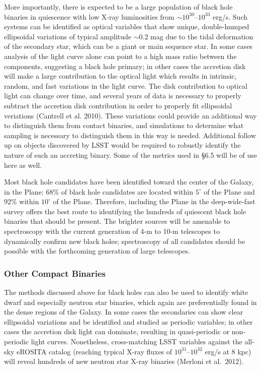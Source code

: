 More importantly, there is expected to be a large population of black hole binaries in quiescence with low X-ray luminosities from $\sim 10^{30}$--$10^{33}$ erg/s.
Such systems can be identified as optical variables that show unique, double-humped ellipsoidal variations of typical amplitude $\sim 0.2$ mag due to the tidal deformation of the secondary star, which can be a giant or main sequence star. In some cases analysis of the light curve alone can point to a high mass ratio between the components, suggesting a black hole primary;
in other cases the accretion disk will make a large contribution to the optical light which results in intrinsic, random, and fast variations in the light curve. The disk contribution to optical light can change over time, and several years of data is necessary to properly subtract the accretion disk contribution in order to properly fit ellipsoidal veriations (Cantrell et al. 2010). These variations could provide an additional way to distinguish them from contact binaries, and simulations to determine what sampling is necessary to distinguish them in this way is needed. Additional follow up on objects discovered by LSST would be required to robustly identify the nature of such an accreting binary. Some of the metrics used in \S 6.5 will be of use here as well. 

Most black hole candidates have been identified toward the center of the Galaxy, in the Plane: 68\% of black hole candidates are located within $5^{\circ}$ of the Plane and 92\% within $10^{\circ}$ of the Plane. Therefore, including the Plane in the deep-wide-fast survey offers the best route to identifying the hundreds of quiescent black hole binaries that should be present. The brighter sources will be amenable to spectroscopy with the current generation of 4-m to 10-m telescopes to dynamically confirm new black holes; spectroscopy of all candidates should be possible with the forthcoming generation of large telescopes.

\subsubsection{Other Compact Binaries}

The methods discussed above for black holes can also be used to identify white dwarf and especially neutron star binaries, which again are preferentially found in the dense regions of the Galaxy.
In some cases the secondaries can show clear ellipsoidal variations and be identified and studied as periodic variables; in other cases the accretion disk light can dominate, resulting in quasi-periodic or
non-periodic light curves. Nonetheless, cross-matching LSST variables against the all-sky eROSITA catalog (reaching typical X-ray fluxes of $10^{31}$--$10^{32}$ erg/s at 8 kpc) will reveal hundreds of new neutron star X-ray binaries (Merloni et al.~2012). 

